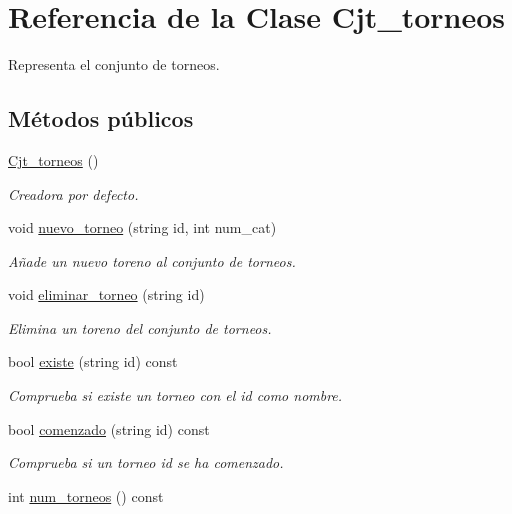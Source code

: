 \hypertarget{class_cjt__torneos}{}\section{Referencia de la Clase Cjt\+\_\+torneos}
\label{class_cjt__torneos}


Representa el conjunto de torneos.  


\subsection*{Métodos públicos}
\begin{DoxyCompactItemize}
\item 
\hyperlink{class_cjt__torneos_acc82582b779afd52bbb92c8094d473ac}{Cjt\+\_\+torneos} ()
\begin{DoxyCompactList}\small\item\em Creadora por defecto. \end{DoxyCompactList}\item 
void \hyperlink{class_cjt__torneos_a8e0f1049c3d772d63b3aefd885677ee3}{nuevo\+\_\+torneo} (string id, int num\+\_\+cat)
\begin{DoxyCompactList}\small\item\em Añade un nuevo toreno al conjunto de torneos. \end{DoxyCompactList}\item 
void \hyperlink{class_cjt__torneos_aa4a23ce93b31fe6c29b9b3a1fee2393a}{eliminar\+\_\+torneo} (string id)
\begin{DoxyCompactList}\small\item\em Elimina un toreno del conjunto de torneos. \end{DoxyCompactList}\item 
bool \hyperlink{class_cjt__torneos_a1c36520142bc446e3f0b2fb9701246c2}{existe} (string id) const
\begin{DoxyCompactList}\small\item\em Comprueba si existe un torneo con el id como nombre. \end{DoxyCompactList}\item 
bool \hyperlink{class_cjt__torneos_a5ba68f778eee8e1050a7f0916755dfa0}{comenzado} (string id) const
\begin{DoxyCompactList}\small\item\em Comprueba si un torneo id se ha comenzado. \end{DoxyCompactList}\item 
int \hyperlink{class_cjt__torneos_aba6d57df308bdbfa173578c108e19b82}{num\+\_\+torneos} () const

\end{DoxyCompactItemize}
